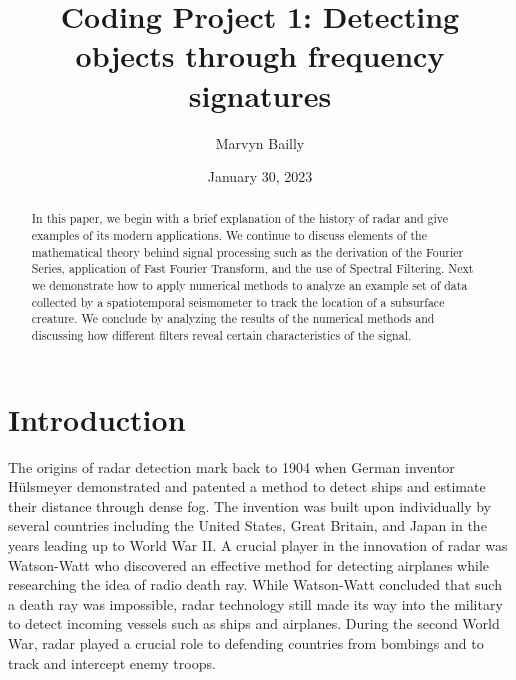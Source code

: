 \documentclass[12pt]{article}%
\numberwithin{equation}{subsection}
\begin{document}
\title{Coding Project 1:  Detecting objects through frequency signatures}

\author{Marvyn Bailly}
\date{January 30, 2023}

\maketitle


\begin{abstract}
In this paper, we begin with a brief explanation of the history of radar and give examples of its modern applications. We continue to discuss elements of the mathematical theory behind signal processing such as the derivation of the Fourier Series, application of Fast Fourier Transform, and the use of Spectral Filtering. Next we demonstrate how to apply numerical methods to analyze an example set of data collected by a spatiotemporal seismometer to track the location of a subsurface creature. We conclude by analyzing the results of the numerical methods and discussing how different filters reveal certain characteristics of the signal. 
\end{abstract}


\section{Introduction}
\label{Sec: Intro}

The origins of radar detection mark back to 1904 when German inventor H\"ulsmeyer demonstrated and patented a method to detect ships and estimate their distance through dense fog. The invention was built upon individually by several countries including the United States, Great Britain, and Japan in the years leading up to World War II. A crucial player in the innovation of radar was Watson-Watt who discovered an effective method for detecting airplanes while researching the idea of radio death ray. While Watson-Watt concluded that such a death ray was impossible, radar technology still made its way into the military to detect incoming vessels such as ships and airplanes. During the second World War, radar played a crucial role to defending countries from bombings and to track and intercept enemy troops. 
\end{document}

